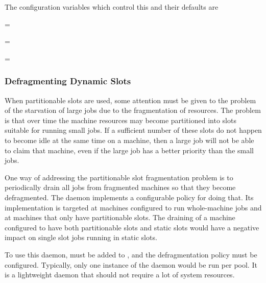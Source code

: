 The  configuration variables which control this 
and their defaults are

\begin{description}
  \item{ = }
  \item{ = }
  \item{ = }
\end{description}


\subsubsection{\label{sec:SMP-defrag}
Defragmenting Dynamic Slots}

When partitionable slots are used, some attention must be given to the
problem of the starvation of large jobs due to the fragmentation of resources.
The problem is that over time the machine resources may become
partitioned into slots suitable for running small jobs.
If a sufficient number of these slots do not happen to become idle at the
same time on a machine, then a large job will not be able to claim that
machine, even if the large job has a better priority than the small jobs.

One way of addressing the partitionable slot fragmentation problem is
to periodically drain all jobs from fragmented machines so that they
become defragmented.  
The  daemon implements a configurable policy for doing that.
Its implementation is targeted at machines configured to run whole-machine
jobs and at machines that only have partitionable slots.
The draining of a machine 
configured to have both partitionable slots and static slots 
would have a negative impact on single slot jobs running in static slots.

To use this daemon,
 must be added to ,
and the defragmentation policy must be configured.
Typically, only one instance of the  daemon would be
run per pool.  
It is a lightweight daemon that should not require a lot of system resources.

